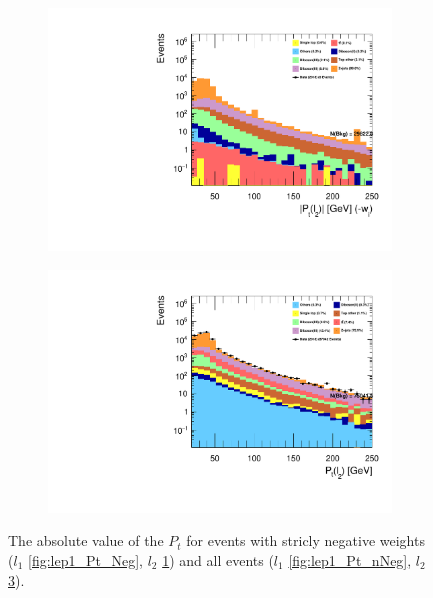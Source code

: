 \begin{figure}
{\begin{subfigure}{.425\textwidth}
        \includegraphics[width=\textwidth]{Figures/FeaturesHistograms/lep2_Pt_Neg.pdf}
        \caption{}
        \label{fig:lep2_Pt_Neg}
    \end{subfigure}
    \hfill
    \begin{subfigure}{.425\textwidth}
        \includegraphics[width=\textwidth]{Figures/FeaturesHistograms/lep2_Pt_nNeg.pdf}
        \caption{ }
        \label{fig:lep2_Pt_nNeg}
    \end{subfigure}
    }
    \caption{The absolute value of the $P_t$ for events with stricly negative weights 
    ($l_1$ \ref{fig:lep1_Pt_Neg}, $l_2$ \ref{fig:lep2_Pt_Neg}) and all events
    ($l_1$ \ref{fig:lep1_Pt_nNeg}, $l_2$ \ref{fig:lep2_Pt_nNeg}). }
\end{figure}

